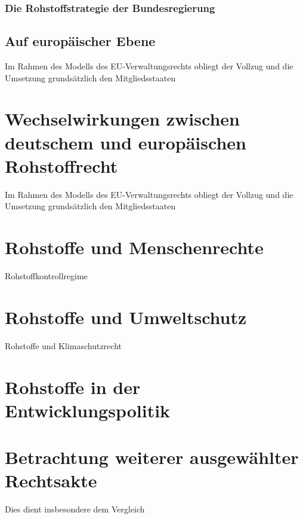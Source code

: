 \documentclass[12pt,a4paper,oneside]{book} %
\begin{document}
	\subsubsection{Die Rohstoffstrategie der Bundesregierung}
	
	\subsection{Auf europäischer Ebene}
	
	Im Rahmen des Modells des EU-Verwaltungsrechts obliegt der Vollzug und die Umsetzung grundsätzlich den Mitgliedsstaaten
	
	\section{Wechselwirkungen zwischen deutschem und europäischen Rohstoffrecht}
		Im Rahmen des Modells des EU-Verwaltungsrechts obliegt der Vollzug und die Umsetzung grundsätzlich den Mitgliedsstaaten
	
	\section{Rohstoffe und Menschenrechte}
	
	Rohstoffkontrollregime
	
	\section{Rohstoffe und Umweltschutz}
	
	Rohstoffe und Klimaschutzrecht
	
	
	\section{Rohstoffe in der Entwicklungspolitik}
	
	\section{Betrachtung weiterer ausgewählter Rechtsakte}
	
	Dies dient insbesondere dem Vergleich 
	
\end{document}
